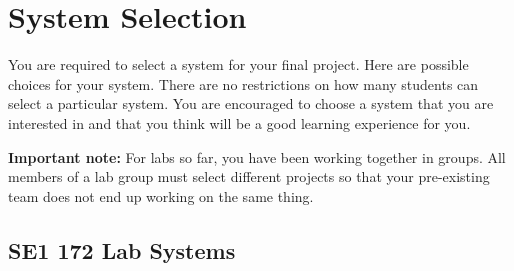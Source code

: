 \documentclass{ee122_notes}
\begin{document}
\section{System Selection}
You are required to select a system for your final project. Here are possible choices for your system. There are no restrictions on how many students can select a particular system. You are encouraged to choose a system that you are interested in and that you think will be a good learning experience for you. 

{\color{red} \textbf{Important note:}} For labs so far, you have been working together in groups. All members of a lab group must select different projects so that your pre-existing team does not end up working on the same thing.

\subsection*{SE1 172 Lab Systems}
\end{document}
